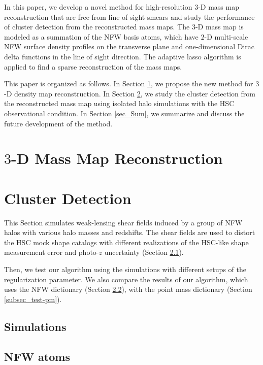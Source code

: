 \documentclass[twocolumn]{aastex63}
\begin{document}
In this paper, we develop a novel method for high-resolution $3$-D mass map
reconstruction that are free from line of sight smears and study the
performance of cluster detection from the reconstructed mass maps.  The $3$-D
mass map is modeled as a summation of the NFW \citep{halo-NFW1997ApJ} basis
atoms, which have $2$-D multi-scale NFW surface density profiles on the
transverse plane and one-dimensional Dirac delta functions in the line of sight
direction. The adaptive lasso algorithm \citep{AdaLASSO-Zou2006} is applied to
find a sparse reconstruction of the mass maps.

This paper is organized as follows.
In Section \ref{sec_Method}, we propose the new method for $3$-D density map
reconstruction.
In Section \ref{sec_Test}, we study the cluster detection from the
reconstructed mass map using isolated halo simulations with the HSC
observational condition.
In Section \ref{sec_Sum}, we summarize and discuss the future development of
the method.


\section{$3$-D Mass Map Reconstruction}
\label{sec_Method}



\section{Cluster Detection}
\label{sec_Test}

This Section simulates weak-lensing shear fields induced by a group of NFW
halos with various halo masses and redshifts. The shear fields are used to
distort the HSC mock shape catalogs with different realizations of the HSC-like
shape measurement error and photo-$z$ uncertainty (Section \ref{subsec_Sims}).

Then, we test our algorithm using the simulations with different setups of the
regularization parameter. We also compare the results of our algorithm, which
uses the NFW dictionary (Section \ref{subsec_test-nfw}), with the point mass
dictionary (Section \ref{subsec_test-pm}).

\subsection{Simulations}
\label{subsec_Sims}


\subsection{NFW atoms}
\label{subsec_test-nfw}

\end{document}
